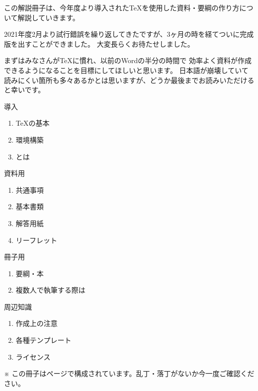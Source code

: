 \pagestyle{empty}

\begin{multicols*}{2}
\setlength{\columnseprule}{0pt}
この解説冊子は、今年度より導入された\TeX を使用した資料・要綱の作り方について解説していきます。

2021年度2月より試行錯誤を繰り返してきた\BunTeX ですが、3ヶ月の時を経てついに完成版を出すことができました。
大変長らくお待たせしました。

まずはみなさんが\TeX に慣れ、以前のWordの半分の時間で
効率よく資料が作成できるようになることを目標にしてほしいと思います。
日本語が崩壊していて読みにくい箇所も多々あるかとは思いますが、どうか最後までお読みいただけると幸いです。


\begin{enumsquare}
    \setlength{\leftskip}{-0.7\zw}
    \item 導入
    \begin{enumerate}
        \renewcommand{\labelenumii}{\hspace{4\zw}□~\ajKakko{\arabic{enumii}}　}
        \item \TeX の基本
        \item 環境構築
        \item \BunTeX とは
    \end{enumerate}
    \item 資料用\BunTeX
    \begin{enumerate}
        \renewcommand{\labelenumii}{\hspace{4\zw}□~\ajKakko{\arabic{enumii}}　}
        \item 共通事項
        \item 基本書類
        \item 解答用紙
        \item リーフレット
    \end{enumerate}
    \item 冊子用\BunTeX
    \begin{enumerate}
        \renewcommand{\labelenumii}{\hspace{4\zw}□~\ajKakko{\arabic{enumii}}　}
        \item 要綱・本
        \item 複数人で執筆する際は
    \end{enumerate}
    \item 周辺知識
    \begin{enumerate}
        \renewcommand{\labelenumii}{\hspace{4\zw}□~\ajKakko{\arabic{enumii}}　}
        \item 作成上の注意
        \item 各種テンプレート
        \item ライセンス
    \end{enumerate}
\end{enumsquare}
\noindent ※ この冊子は\lastpage ページで構成されています。乱丁・落丁がないか今一度ご確認ください。


\end{multicols*}
